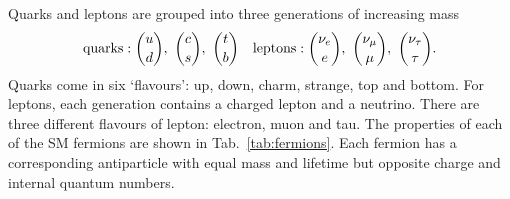 Quarks and leptons are grouped into three generations of increasing mass
\begin{equation}
{\rm quarks}: \binom{{u}}{{d}},~\binom{{c}}{{s}},~\binom{{t}}{{b}} ~~~ {\rm leptons}: \binom{{{\nu}_e}}{{e}},~\binom{{{\nu}_\mu}}{\mu},~\binom{{{\nu}_\tau}}{\tau}. \nonumber
\end{equation}  
\noindent Quarks come in six `flavours': up, down, charm, strange, top and bottom. For leptons, each generation contains a charged lepton and a neutrino. There are three different flavours of lepton: electron, muon and tau. The properties of each of the SM fermions are shown in Tab.~\ref{tab:fermions}. Each fermion has a corresponding antiparticle with equal mass and lifetime but opposite charge and internal quantum numbers.

\begin{table}[!tb]
\def\arraystretch{1.1}
\caption{Properties of the quarks and leptons in the SM. The particle masses are taken from~\cite{pdg}.}
\begin{center}
\end{center}
\label{tab:fermions}
\end{table}

